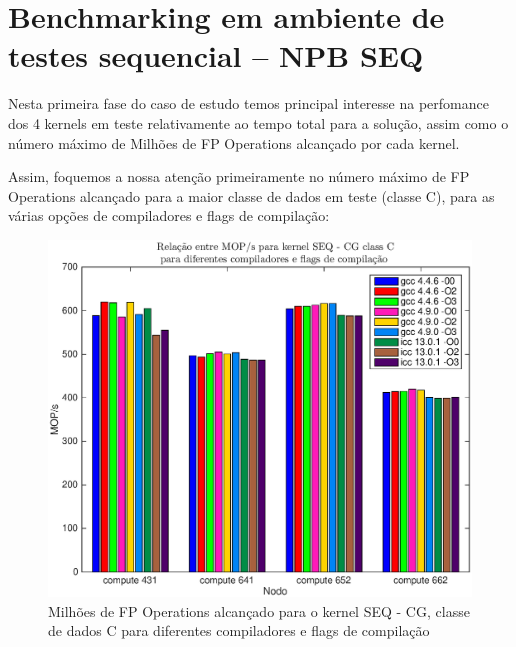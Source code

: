 \documentclass[conference,compsoc]{IEEEtran}
\begin{document}


\section{Benchmarking em ambiente de testes sequencial -- NPB SEQ}

Nesta primeira fase do caso de estudo temos principal interesse na perfomance dos 4 kernels em teste relativamente ao tempo total para a solução, assim como o número máximo de Milhões de FP Operations alcançado por cada kernel.\par Assim, foquemos a nossa atenção primeiramente no número máximo de FP Operations alcançado para a maior classe de dados em teste (classe C), para as várias opções de compiladores e flags de compilação:

\begin{figure}[H]
\centering
\includegraphics[width=1.1\columnwidth]{EPS/SEQ/MOPS_seq_cg_C.eps}
\caption{Milhões de FP Operations alcançado para o kernel SEQ - CG, classe de dados C para diferentes compiladores e flags de compilação}
\label{mops_seq_cg_c}
\end{figure}
\end{document}
